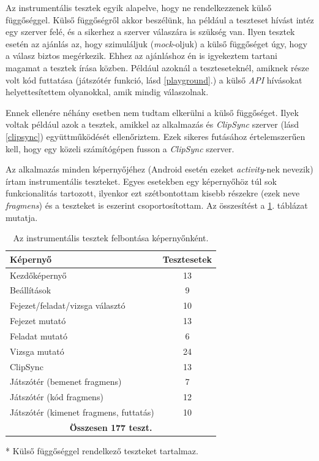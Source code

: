 \documentclass[12pt,a4paper]{article}
\begin{document}
	 Az instrumentális tesztek egyik alapelve, hogy ne rendelkezzenek külső függőséggel. Külső függőségről akkor beszélünk, ha például a teszteset hívást intéz egy szerver felé, és a sikerhez a szerver válaszára is szükség van. Ilyen tesztek esetén az ajánlás az, hogy szimuláljuk (\textit{mock}-oljuk) a külső függőséget úgy, hogy a válasz biztos megérkezik. Ehhez az ajánláshoz én is igyekeztem tartani magamat a tesztek írása közben. Például azoknál a teszteseteknél, amiknek része volt kód futtatása (játszótér funkció, lásd \ref{playground}.) a külső \textit{API} hívásokat helyettesítettem olyanokkal, amik mindig válaszolnak. 
	 
	 Ennek ellenére néhány esetben nem tudtam elkerülni a külső függőséget. Ilyek voltak például azok a tesztek, amikkel az alkalmazás és \textit{ClipSync} szerver (lásd \ref{clipsync}) együttműködését ellenőriztem. Ezek sikeres futásához értelemszerűen kell, hogy egy közeli számítógépen fusson a \textit{ClipSync} szerver.
	
	 Az alkalmazás minden képernyőjéhez (Android esetén ezeket \textit{activity}-nek nevezik) írtam instrumentális teszteket. Egyes esetekben egy képernyőhöz túl sok funkcionalitás tartozott, ilyenkor ezt szétbontottam kisebb részekre (ezek neve \textit{fragmens}) és a teszteket is eszerint csoportosítottam. Az összesítést a \ref{table_test_summary}. táblázat mutatja. 
	
	\bigskip
	\begin{table}[h!]
		\centering
			\begin{threeparttable}
			\begin{tabular}{|l|c|}
				\hline
				\textbf{Képernyő} & \textbf{Tesztesetek} \\
				\hline
				Kezdőképernyő & 13 \\
				\hline
				Beállítások & 9 \\
				\hline
				Fejezet/feladat/vizsga választó & 10 \\
				\hline
				Fejezet mutató & 13 \\
				\hline
				Feladat mutató & 6 \\
				\hline
				Vizsga mutató & 24 \\
				\hline
				ClipSync & 13\tnote{*} \\
				\hline
				Játszótér (bemenet fragmens) & 7 \\
				\hline
				Játszótér (kód fragmens) & 12 \\
				\hline
				Játszótér (kimenet fragmens, futtatás) & 10 \\
				\hline
				\multicolumn{2}{|c|}{\textbf{Összesen 177 teszt.}}\\
				\hline
			\end{tabular}
			\begin{tablenotes}
				\item[*] Külső függőséggel rendelkező teszteket tartalmaz.
			\end{tablenotes}
		\end{threeparttable}
		\caption{Az instrumentális tesztek felbontása képernyőnként.}
		\label{table_test_summary}
	\end{table}
\end{document}
